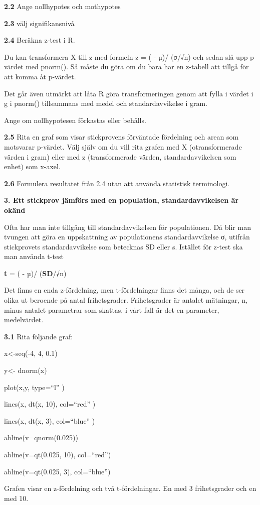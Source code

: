 \documentclass[
  letterpaper,
  DIV=11,
  numbers=noendperiod]{scrartcl}
\begin{document}
\textbf{2.2} Ange nollhypotes och mothypotes

\textbf{2.3} välj signifikansnivå

\textbf{2.4} Beräkna z-test i R.

Du kan transformera X till z med formeln z = ( - µ)/ (σ/√n) och sedan
slå upp p värdet med pnorm(). Så måste du göra om du bara har en
z-tabell att tillgå för att komma åt p-värdet.

Det går även utmärkt att låta R göra transformeringen genom att fylla i
värdet i g i pnorm() tillsammans med medel och standardavvikelse i gram.

Ange om nollhypotesen förkastas eller behålls.

\textbf{2.5} Rita en graf som visar stickprovens förväntade fördelning
och arean som motsvarar p-värdet. Välj själv om du vill rita grafen med
X (otransformerade värden i gram) eller med z (transformerade värden,
standardavvikelsen som enhet) som x-axel.

\textbf{2.6} Formulera resultatet från 2.4 utan att använda statistisk
terminologi.

\textbf{3. Ett stickprov jämförs med en population, standardavvikelsen
är okänd}

Ofta har man inte tillgång till standardavvikelsen för populationen. Då
blir man tvungen att göra en uppskattning av populationens
standardavvikelse σ, utifrån stickprovets standardavvikelse som
betecknas SD eller s. Istället för z-test ska man använda t-test

\textbf{t} = ( - µ)/ (\textbf{SD}/√n)

Det finns en enda z-fördelning, men t-fördelningar finns det många, och
de ser olika ut beroende på antal frihetsgrader. Frihetsgrader är
antalet mätningar, n, minus antalet parametrar som skattas, i vårt fall
är det en parameter, medelvärdet.

\textbf{3.1} Rita följande graf:

x\textless-seq(-4, 4, 0.1)

y\textless- dnorm(x)

plot(x,y, type=``l'' )

lines(x, dt(x, 10), col=``red'' )

lines(x, dt(x, 3), col=``blue'' )

abline(v=qnorm(0.025))

abline(v=qt(0.025, 10), col=``red'')

abline(v=qt(0.025, 3), col=``blue'')

Grafen visar en z-fördelning och två t-fördelningar. En med 3
frihetsgrader och en med 10.
\end{document}

